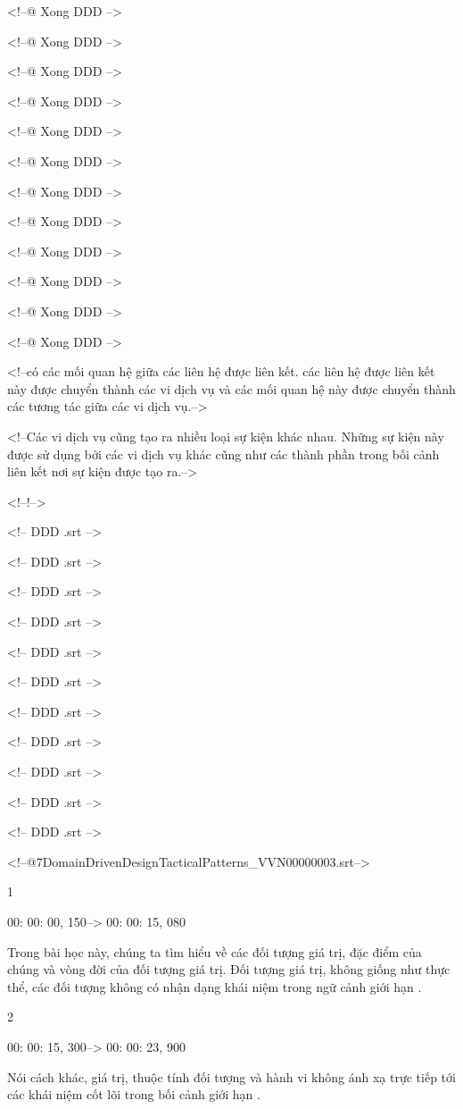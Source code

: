 <!--@ Xong DDD -->

<!--@ Xong DDD -->

<!--@ Xong DDD -->

<!--@ Xong DDD -->

<!--@ Xong DDD -->

<!--@ Xong DDD -->

<!--@ Xong DDD -->

<!--@ Xong DDD -->

<!--@ Xong DDD -->

<!--@ Xong DDD -->

<!--@ Xong DDD -->

<!--@ Xong DDD -->

<!--có các mối quan hệ giữa các liên hệ được liên kết. các liên hệ được liên kết này được chuyển thành các vi dịch vụ và các mối quan hệ này được chuyển thành các tương tác giữa các vi dịch vụ.-->

<!--Các vi dịch vụ cũng tạo ra nhiều loại sự kiện khác nhau. Những sự kiện này được sử dụng bởi các vi dịch vụ khác cũng như các thành phần trong bối cảnh liên kết nơi sự kiện được tạo ra.-->

<!--!-->

<!-- DDD .srt -->

<!-- DDD .srt -->

<!-- DDD .srt -->

<!-- DDD .srt -->

<!-- DDD .srt -->

<!-- DDD .srt -->

<!-- DDD .srt -->

<!-- DDD .srt -->

<!-- DDD .srt -->

<!-- DDD .srt -->

<!-- DDD .srt -->

<!--@\07DomainDrivenDesignTacticalPatterns_VVN\000000003.srt-->

1

00: 00: 00, 150--> 00: 00: 15, 080

Trong bài học này, chúng ta tìm hiểu về các đối tượng giá trị, đặc điểm của chúng và vòng đời của đối tượng giá trị. Đối tượng giá trị, không giống như thực thể, các đối tượng không có nhận dạng khái niệm trong ngữ cảnh giới hạn .

2

00: 00: 15, 300--> 00: 00: 23, 900

Nói cách khác, giá trị, thuộc tính đối tượng và hành vi không ánh xạ trực tiếp tới các khái niệm cốt lõi trong bối cảnh giới hạn .

